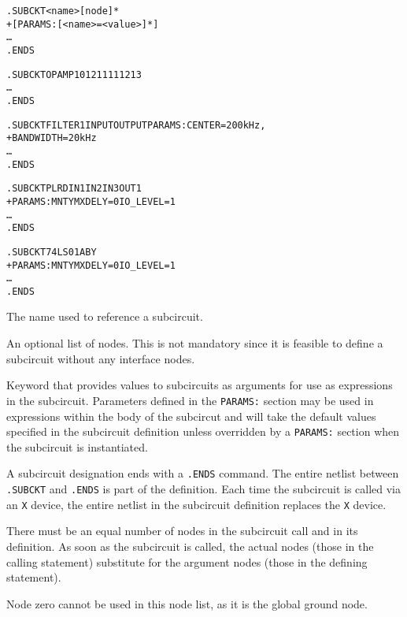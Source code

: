 \begin{Command}

\format
\begin{alltt}
.SUBCKT <name> [node]*
+ [PARAMS: [<name>=<value>]* ]
\ldots
.ENDS
\end{alltt}

\examples
\begin{alltt}
.SUBCKT OPAMP 10 12 111 112 13
\ldots
.ENDS

.SUBCKT FILTER1 INPUT OUTPUT PARAMS: CENTER=200kHz,
+ BANDWIDTH=20kHz
\ldots
.ENDS

.SUBCKT PLRD IN1 IN2 IN3 OUT1
+ PARAMS: MNTYMXDELY=0 IO_LEVEL=1
\ldots
.ENDS

.SUBCKT 74LS01 A B Y
+ PARAMS: MNTYMXDELY=0 IO_LEVEL=1
\ldots
.ENDS
\end{alltt}

\arguments

\begin{Arguments}
The  name used to reference a subcircuit.

An optional list of nodes. This is not mandatory since it is
feasible to define a subcircuit without any interface nodes.

Keyword that provides values to subcircuits as arguments for use as
expressions in the subcircuit.  Parameters defined in the \texttt{PARAMS:}
section may be used in expressions within the body of the subcircut and
will take the default values specified in the subcircuit definition unless
overridden by a \texttt{PARAMS:} section when the subcircuit is
instantiated.

\end{Arguments}

\comments
A subcircuit  designation ends with a
\texttt{.ENDS} command. The entire netlist between \texttt{.SUBCKT} and
\texttt{.ENDS} is part of the definition. Each time the subcircuit is called
via an \texttt{X} device, the entire netlist in the subcircuit definition
replaces the \texttt{X} device.

There must be an equal number of nodes in the subcircuit call and in its
definition.  As soon as the subcircuit is called, the actual nodes (those in
the calling statement) substitute for the argument nodes (those in the
defining statement).

Node zero cannot be used in this node list, as
it is the global ground node.


\end{Command}
